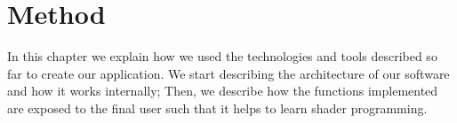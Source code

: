 \chapter{Method}
In this chapter we explain how we used the technologies and tools described so far to create our application. We start describing the architecture of our software and how it works internally; Then, we describe how the functions implemented are exposed to the final user such that it helps to learn shader programming.




